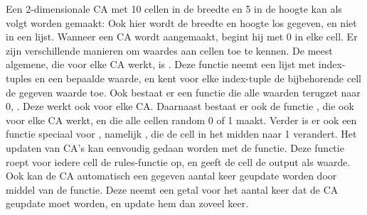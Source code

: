 {}Een 2-dimensionale CA met 10 cellen in de breedte en 5 in de hoogte kan als volgt worden gemaakt:\markdownRendererInterblockSeparator
{}\markdownRendererInterblockSeparator
{}Ook hier wordt de breedte en hoogte los gegeven, en niet in een lijst.\markdownRendererInterblockSeparator
{}\markdownRendererInterblockSeparator
{}Wanneer een CA wordt aangemaakt, begint hij met 0 in elke cell. Er zijn verschillende manieren om waardes aan cellen toe te kennen.\markdownRendererInterblockSeparator
{}De meest algemene, die voor elke CA werkt, is . Deze functie neemt een lijst met index-tuples en een bepaalde waarde, en kent voor elke index-tuple de bijbehorende cell de gegeven waarde toe.\markdownRendererInterblockSeparator
{}\markdownRendererInterblockSeparator
{}Ook bestaat er een functie die alle waarden terugzet naar 0, . Deze werkt ook voor elke CA.\markdownRendererInterblockSeparator
{}\markdownRendererInterblockSeparator
{}Daarnaast bestaat er ook de functie , die ook voor elke CA werkt, en die alle cellen random 0 of 1 maakt.\markdownRendererInterblockSeparator
{}\markdownRendererInterblockSeparator
{}Verder is er ook een functie speciaal voor , namelijk , die de cell in het midden naar 1 verandert.\markdownRendererInterblockSeparator
{}\markdownRendererInterblockSeparator
{}\markdownRendererInterblockSeparator
{}Het updaten van CA's kan eenvoudig gedaan worden met de  functie. Deze functie roept voor iedere cell de rules-functie op, en geeft de cell de output als waarde.\markdownRendererInterblockSeparator
{}\markdownRendererInterblockSeparator
{}Ook kan de CA automatisch een gegeven aantal keer geupdate worden door middel van de  functie. Deze neemt een getal voor het aantal keer dat de CA geupdate moet worden, en update hem dan zoveel keer.\markdownRendererInterblockSeparator
